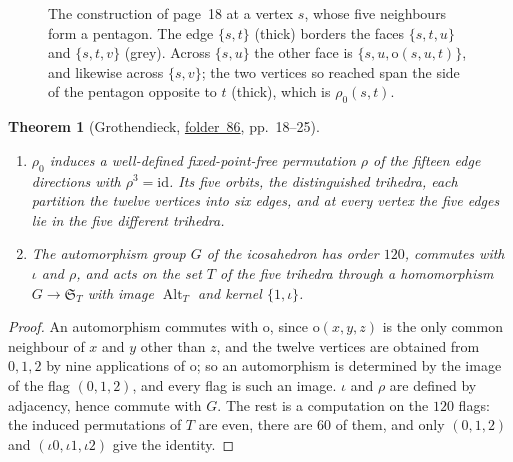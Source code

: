\documentclass[11pt,a4paper]{amsart}
\newtheorem{theorem}{Theorem}[section]
\theoremstyle{definition}
\theoremstyle{remark}
\newcommand{\id}{\mathrm{id}}
\newcommand{\Alt}{\operatorname{Alt}}
\newcommand{\fac}[1]{\href{https://grothendieck.umontpellier.fr/#1.pdf}{folder~#1}}
\begin{document}
\begin{figure}[ht]
\centering
{}
\caption{The construction of page~18 at a vertex $s$, whose five neighbours form a pentagon. The edge $\{s, t\}$ (thick) borders the faces $\{s, t, u\}$ and $\{s, t, v\}$ (grey). Across $\{s, u\}$ the other face is $\{s, u, \mathrm o(s, u, t)\}$, and likewise across $\{s, v\}$; the two vertices so reached span the side of the pentagon opposite to $t$ (thick), which is $\rho_0(s, t)$.}\label{fig:rho0}
\end{figure}

\begin{theorem}[Grothendieck, \fac{86}, pp.~18--25]\label{thm:triedres}
\leavevmode
\begin{enumerate}
\item $\rho_0$ induces a well-defined fixed-point-free permutation $\rho$ of the fifteen edge directions with $\rho^3 = \id$. Its five orbits, the \emph{distinguished trihedra}, each partition the twelve vertices into six edges, and at every vertex the five edges lie in the five different trihedra.
\item The automorphism group $G$ of the icosahedron has order $120$, commutes with $\iota$ and $\rho$, and acts on the set $T$ of the five trihedra through a homomorphism $G \to \mathfrak S_T$ with image $\Alt_T$ and kernel $\{1, \iota\}$.
\end{enumerate}
\end{theorem}

\begin{proof}
An automorphism commutes with $\mathrm o$, since $\mathrm o(x, y, z)$ is the only common neighbour of $x$ and $y$ other than $z$, and the twelve vertices are obtained from $0, 1, 2$ by nine applications of $\mathrm o$; so an automorphism is determined by the image of the flag $(0, 1, 2)$, and every flag is such an image. $\iota$ and $\rho$ are defined by adjacency, hence commute with $G$. The rest is a computation on the $120$ flags: the induced permutations of $T$ are even, there are $60$ of them, and only $(0,1,2)$ and $(\iota0, \iota1, \iota2)$ give the identity.
\end{proof}
\end{document}
